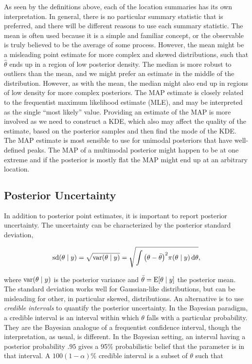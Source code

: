 As seen by the definitions above, each of the location summaries has its own interpretation. In general, there is no particular summary statistic that is preferred, and there will be different reasons to use each summary statistic. The mean is often used because it is a simple and familiar concept, or the observable is truly believed to be the average of some process. However, the mean might be a misleading point estimate for more complex and skewed distributions, such that $\hat{\theta}$ ends up in a region of low posterior density. The median is more robust to outliers than the mean, and we might prefer an estimate in the middle of the distribution. However, as with the mean, the median might also end up in regions of low density for more complex posteriors. The MAP estimate is closely related to the frequentist maximum likelihood estimate (MLE), and may be interpreted as the single “most likely” value. Providing an estimate of the MAP is more involved as we need to construct a KDE, which also may affect the quality of the estimate, based on the posterior samples and then find the mode of the KDE. The MAP estimate is most sensible to use for unimodal posteriors that have well-defined peaks. The MAP of a multimodal posterior might happen to be at one extreme and if the posterior is mostly flat the MAP might end up at an arbitrary location.  


\subsection{Posterior Uncertainty} 

In addition to posterior point estimates, it is important to report posterior uncertainty. The uncertainty can be characterized by the posterior standard deviation,

\begin{equation*}
    \mathrm{sd} \qty(\theta \mid y) = \sqrt{\mathrm{var}\qty(\theta \mid y)} = \sqrt{\int \qty(\theta - \bar{\theta})^2 \pi \qty(\theta \mid y) \dd{\theta}},
\end{equation*} 

where $\mathrm{var}\qty(\theta \mid y)$ is the posterior variance and $\bar{\theta} = \mathrm{E} \qty[\theta \mid y]$ the posterior mean. The standard deviation works well for Gaussian-like distributions, but can be misleading for other, in particular skewed, distributions. An alternative is to use \textit{credible intervals} to quantify the posterior uncertainty. In the Bayesian paradigm, a credible interval is an interval within which $\theta$ falls with a particular probability. They are the Bayesian analogue of a frequentist confidence interval, though the interpretation, as usual, is different. In the Bayesian setting, an interval having a posterior probability $.95$ gives a 95\% probabilistic belief that the parameter is in that interval. A $100(1-\alpha)\%$ credible interval is a subset of $\theta$ such that

